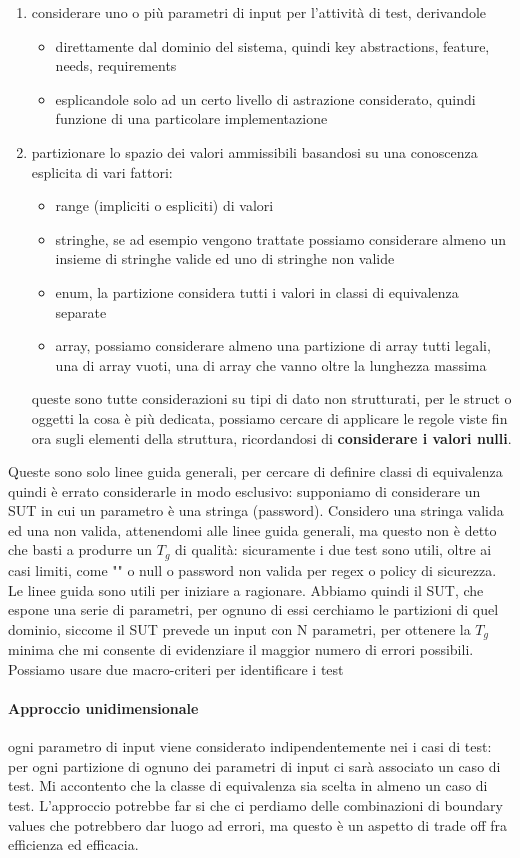 \documentclass{article}
\begin{document}
\begin{enumerate}
\item considerare uno o più parametri di input per l'attività di test, derivandole
\begin{itemize}
\item direttamente dal dominio del sistema, quindi key abstractions, feature, needs, requirements 
\item esplicandole solo ad un certo livello di astrazione considerato, quindi funzione di una particolare implementazione
\end{itemize}
\item partizionare lo spazio dei valori ammissibili basandosi su una conoscenza esplicita di vari fattori:
\begin{itemize}
\item range (impliciti o espliciti) di valori
\item stringhe, se ad esempio vengono trattate possiamo considerare almeno un insieme di stringhe valide ed uno di stringhe non valide
\item enum, la partizione considera tutti i valori in classi di equivalenza separate
\item array, possiamo considerare almeno una partizione di array tutti legali, una di array vuoti, una di array che vanno oltre la lunghezza massima
\end{itemize}
queste sono tutte considerazioni su tipi di dato non strutturati, per le struct o oggetti la cosa è più dedicata, possiamo cercare di applicare le regole viste fin ora sugli elementi della struttura, ricordandosi di 	\textbf{considerare i valori nulli}.
\end{enumerate}
Queste sono solo linee guida generali, per cercare di definire classi di equivalenza quindi è errato considerarle in modo esclusivo: supponiamo di considerare un SUT in cui un parametro è una stringa (password). Considero una stringa valida ed una non valida, attenendomi alle linee guida generali, ma questo non è detto che basti a produrre un $T_g$ di qualità: sicuramente i due test sono utili, oltre ai casi limiti, come "" o null o password non valida per regex o policy di sicurezza. Le linee guida sono utili per iniziare a ragionare. Abbiamo quindi il SUT, che espone una serie di parametri, per ognuno di essi cerchiamo le partizioni di quel dominio, siccome il SUT prevede un input con N parametri, per ottenere la $T_g$ minima che mi consente di evidenziare il maggior numero di errori possibili. Possiamo usare due macro-criteri per identificare i test
\paragraph{Approccio unidimensionale}ogni parametro di input viene considerato indipendentemente nei i casi di test: per ogni partizione di ognuno dei parametri di input ci sarà associato un caso di test. Mi accontento che la classe di equivalenza sia scelta in almeno un caso di test. L'approccio potrebbe far si che ci perdiamo delle combinazioni di boundary values che potrebbero dar luogo ad errori, ma questo è un aspetto di trade off fra efficienza ed efficacia.
\end{document}
